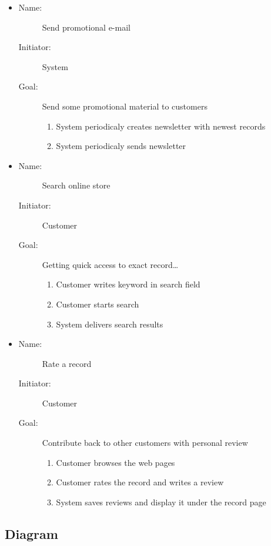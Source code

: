 \documentclass[12pt, titlepage]{article}
\begin{document}
\begin{description}
\begin{itemize}
    \item
        \begin{description}
            \item[Name:]Send promotional e-mail 
            \item[Initiator:]System
            \item[Goal:]Send some promotional material to customers 
	    \begin{enumerate}
		\item System periodicaly creates newsletter with newest records
		\item System periodicaly sends newsletter
		\end{enumerate}
        \end{description}

    \item 
        \begin{description}
            \item[Name:]Search online store
		    \item[Initiator:]Customer
		    \item[Goal:]Getting quick access to exact record\dots
		    \begin{enumerate}
		    	\item Customer writes keyword in search field
			\item Customer starts search
			\item System delivers search results
		    \end{enumerate}
        \end{description}
    \item 
        \begin{description}
		\item[Name:]Rate a record 
		\item[Initiator:]Customer 
		\item[Goal:]Contribute back to other customers with personal review 
			\begin{enumerate}
			\item Customer browses the web pages
			\item Customer rates the record and writes a review
			\item System saves reviews and display it under the record page
			\end{enumerate}
        \end{description}
    \end{itemize}
\end{description}

\subsection{Diagram}
\end{document}
